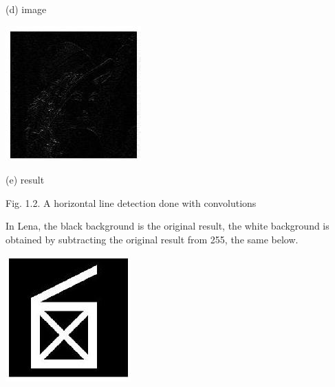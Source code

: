 \documentclass[10pt]{article}
\begin{document}
(d) image

\includegraphics[max width=\textwidth]{2022_01_06_b5ce182ed1bd5f482e5bg-09(3)}

(e) result

Fig. 1.2. A horizontal line detection done with convolutions

In Lena, the black background is the original result, the white background is obtained by subtracting the original result from 255, the same below.

\includegraphics[max width=\textwidth]{2022_01_06_b5ce182ed1bd5f482e5bg-10}
\end{document}
